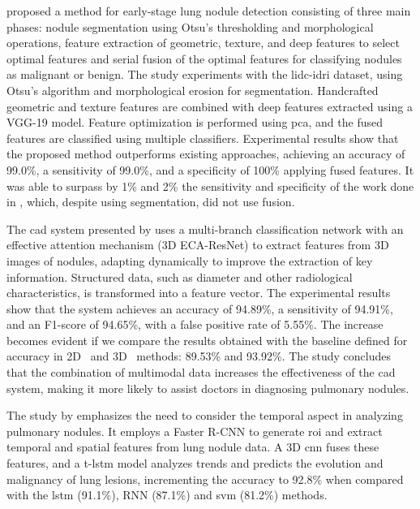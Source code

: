 \textcite{saba_lung_2019} proposed a method for early-stage lung nodule detection consisting of three main phases: nodule segmentation using Otsu's thresholding and morphological operations, feature extraction of geometric, texture, and deep features to select optimal features and serial fusion of the optimal features for classifying nodules as malignant or benign. The study experiments with the \ac{lidc-idri} dataset, using Otsu's algorithm and morphological erosion for segmentation. Handcrafted geometric and texture features are combined with deep features extracted using a VGG-19 model. Feature optimization is performed using \ac{pca}, and the fused features are classified using multiple classifiers. Experimental results show that the proposed method outperforms existing approaches, achieving an accuracy of 99.0\%,  a sensitivity of 99.0\%, and a specificity of 100\% applying fused features. It was able to surpass by 1\% and 2\% the sensitivity and specificity of the work done in \cite{naqi_multistage_2018}, which, despite using segmentation, did not use fusion.

The \ac{cad} system presented by \textcite{yuan_multi-modal_2023} uses a multi-branch classification network with an effective attention mechanism (3D ECA-ResNet) to extract features from 3D images of nodules, adapting dynamically to improve the extraction of key information. Structured data, such as diameter and other radiological characteristics, is transformed into a feature vector. The experimental results show that the system achieves an accuracy of 94.89\%, a sensitivity of 94.91\%, and an F1-score of 94.65\%, with a false positive rate of 5.55\%. The increase becomes evident if we compare the results obtained with the baseline defined for accuracy in 2D~\cite{xie_fusing_2018} and 3D~\cite{zhao_combining_2020} methods: 	
89.53\% and 93.92\%. The study concludes that the combination of multimodal data increases the effectiveness of the \ac{cad} system, making it more likely to assist doctors in diagnosing pulmonary nodules.

The study by \textcite{liu_study_2022} emphasizes the need to consider the temporal aspect in analyzing pulmonary nodules. It employs a Faster R-CNN to generate \ac{roi} and extract temporal and spatial features from lung nodule data. A 3D \ac{cnn} fuses these features, and a \ac{t-lstm} model analyzes trends and predicts the evolution and malignancy of lung lesions, incrementing the accuracy to 92.8\% when compared with the \ac{lstm} (91.1\%), RNN (87.1\%) and \ac{svm} (81.2\%) methods.


